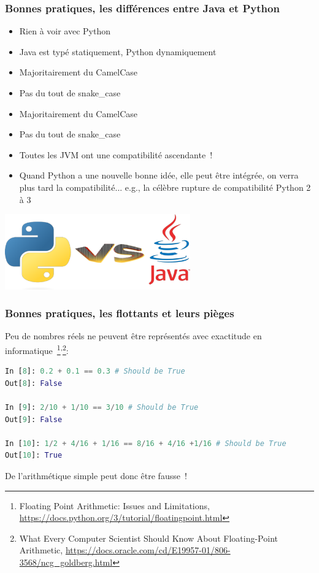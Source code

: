 \documentclass{beamer}
\begin{document}
    \begin{frame}
        \transdissolve
        \frametitle{Bonnes pratiques, les différences entre Java et Python}

        \begin{itemize}

            \item Rien à voir avec Python
            \item Java est typé statiquement, Python dynamiquement
            \item Majoritairement du CamelCase
            \item Pas du tout de snake\_case
            \item Majoritairement du CamelCase
            \item Pas du tout de snake\_case
            \item Toutes les JVM ont une compatibilité ascendante~!
            \item Quand Python a une nouvelle bonne idée, elle peut être intégrée, on verra plus tard la compatibilité... e.g., la célèbre rupture de compatibilité Python 2 à 3

        \end{itemize}

        \centering
        \includegraphics[width=8cm]{image/Java-vs-Python.png}

    \end{frame}

    \begin{frame}[fragile]
        \transdissolve
        \frametitle{Bonnes pratiques, les flottants et leurs pièges}
        \pause
        Peu de nombres réels ne peuvent être représentés avec exactitude en informatique~\footnote{Floating Point Arithmetic: Issues and Limitations, \url{https://docs.python.org/3/tutorial/floatingpoint.html}}\textsuperscript{,}\footnote{What Every Computer Scientist Should Know About Floating-Point Arithmetic, \url{https://docs.oracle.com/cd/E19957-01/806-3568/ncg_goldberg.html}}:

        \begin{lstlisting}[language=python]
In [8]: 0.2 + 0.1 == 0.3 # Should be True
Out[8]: False

In [9]: 2/10 + 1/10 == 3/10 # Should be True
Out[9]: False

In [10]: 1/2 + 4/16 + 1/16 == 8/16 + 4/16 +1/16 # Should be True
Out[10]: True
        \end{lstlisting}

        De l'arithmétique simple peut donc être fausse~!
    \end{frame}
\end{document}
